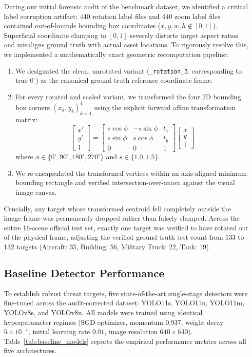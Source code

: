 \documentclass[conference]{IEEEtran}
\begin{document}
During our initial forensic audit of the benchmark dataset, we identified a critical label corruption artifact: 440 rotation label files and 440 zoom label files contained out-of-bounds bounding box coordinates ($x, y, w, h \notin [0, 1]$). Superficial coordinate clamping to $[0, 1]$ severely distorts target aspect ratios and misaligns ground truth with actual asset locations. To rigorously resolve this, we implemented a mathematically exact geometric recomputation pipeline:
\begin{enumerate}
    \item We designated the clean, unrotated variant (\texttt{\_rotation\_3}, corresponding to true $0^\circ$) as the canonical ground-truth reference coordinate frame.
    \item For every rotated and scaled variant, we transformed the four 2D bounding box corners $(x_k, y_k)_{k=1}^4$ using the explicit forward affine transformation matrix:
    \begin{equation}
    \begin{bmatrix} x' \\ y' \\ 1 \end{bmatrix} = \begin{bmatrix} s \cos\phi & -s \sin\phi & t_x \\ s \sin\phi & s \cos\phi & t_y \\ 0 & 0 & 1 \end{bmatrix} \begin{bmatrix} x \\ y \\ 1 \end{bmatrix}
    \end{equation}
    where $\phi \in \{0^\circ, 90^\circ, 180^\circ, 270^\circ\}$ and $s \in \{1.0, 1.5\}$.
    \item We re-encapsulated the transformed vertices within an axis-aligned minimum bounding rectangle and verified intersection-over-union against the visual image canvas.
\end{enumerate}
Crucially, any target whose transformed centroid fell completely outside the image frame was permanently dropped rather than falsely clamped. Across the entire 16-scene official test set, exactly one target was verified to have rotated out of the physical frame, adjusting the verified ground-truth test count from 133 to 132 targets (Aircraft: 35, Building: 56, Military Truck: 22, Tank: 19).

\subsection{Baseline Detector Performance}
To establish robust threat targets, five state-of-the-art single-stage detectors were fine-tuned across the audit-corrected dataset: YOLO11s, YOLO11n, YOLO11m, YOLOv8s, and YOLOv8n. All models were trained using identical hyperparameter regimes (SGD optimizer, momentum 0.937, weight decay $5\times 10^{-4}$, initial learning rate $0.01$, image resolution $640\times 640$). Table~\ref{tab:baseline_models} reports the empirical performance metrics across all five architectures.
\end{document}
